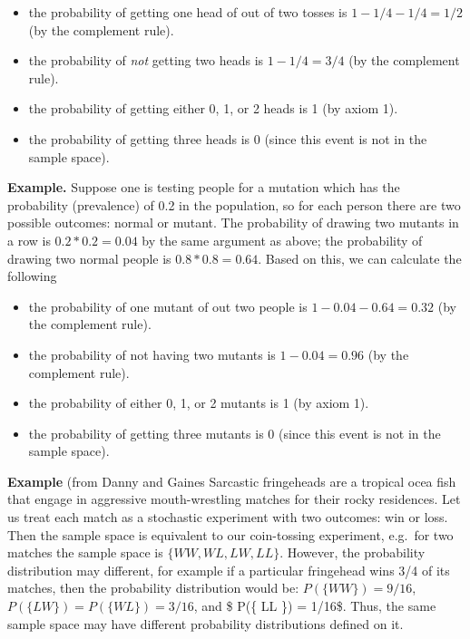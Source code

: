 \documentclass[
]{book}
\providecommand{\tightlist}{%
  \setlength{\itemsep}{0pt}\setlength{\parskip}{0pt}}
\theoremstyle{definition}
\theoremstyle{definition}
\theoremstyle{definition}
\theoremstyle{remark}
\begin{document}
\begin{itemize}
\tightlist
\item
  the probability of getting one head of out of two tosses is \(1-1/4-1/4=1/2\) (by the complement rule).
\item
  the probability of \emph{not} getting two heads is \(1-1/4 = 3/4\) (by the complement rule).\\
\item
  the probability of getting either 0, 1, or 2 heads is 1 (by axiom 1).
\item
  the probability of getting three heads is 0 (since this event is not in the sample space).
\end{itemize}

\textbf{Example.} Suppose one is testing people for a mutation which has the probability (prevalence) of 0.2 in the population, so for each person there are two possible outcomes: normal or mutant. The probability of drawing two mutants in a row is \(0.2*0.2=0.04\) by the same argument as above; the probability of drawing two normal people is \(0.8*0.8 =0.64\). Based on this, we can calculate the following

\begin{itemize}
\tightlist
\item
  the probability of one mutant of out two people is \(1-0.04-0.64=0.32\) (by the complement rule).
\item
  the probability of not having two mutants is \(1-0.04 = 0.96\) (by the complement rule).\\
\item
  the probability of either 0, 1, or 2 mutants is 1 (by axiom 1).
\item
  the probability of getting three mutants is 0 (since this event is not in the sample space).
\end{itemize}

\textbf{Example} (from Danny and Gaines Sarcastic fringeheads are a tropical ocea fish that engage in aggressive mouth-wrestling matches for their rocky residences. Let us treat each match as a stochastic experiment with two outcomes: win or loss. Then the sample space is equivalent to our coin-tossing experiment, e.g.~for two matches the sample space is \(\{ WW, WL, LW, LL \}\). However, the probability distribution may different, for example if a particular fringehead wins 3/4 of its matches, then the probability distribution would be: \(P(\{ WW \}) = 9/16\), \(P(\{ LW \}) = P(\{ WL \}) = 3/16\), and \$ P(\{ LL \}) = 1/16\$. Thus, the same sample space may have different probability distributions defined on it.
\end{document}
